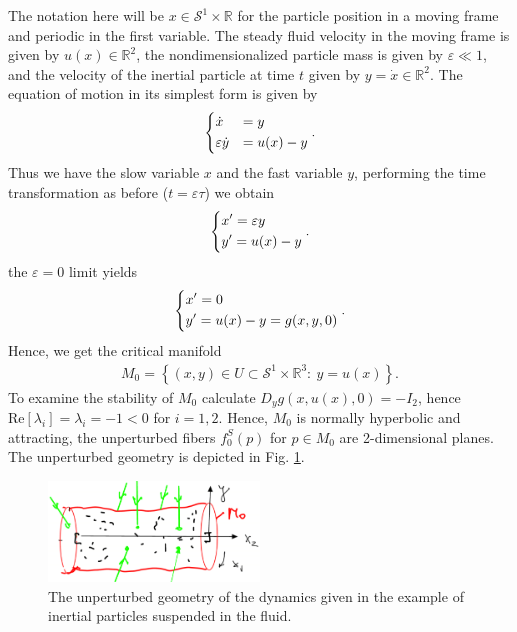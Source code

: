 \begin{ex}
The notation here will be $x\in \mathcal{S}^{1}\times \mathbb{R}$ for the particle position in a moving frame and periodic in the first variable. The steady fluid velocity in the moving frame is given by $u(x) \in \mathbb{R}^{2}$, the nondimensionalized particle mass is given by $\varepsilon \ll 1$, and the velocity of the inertial particle at time $t$ given by $y=\dot{x}\in \mathbb{R}^{2}$. The equation of motion in its simplest form is given by \cite{Maxey1983}
\begin{align}
	\begin{dcases}
		\dot{x} &=y\\
		\varepsilon \dot{y} & = u(x) - y
	\end{dcases}
	.
\end{align}
Thus we have the slow variable $x$ and the fast variable $y$, performing the time transformation as before ($t = \varepsilon \tau$) we obtain
\begin{align}
\begin{dcases}
	x' = \varepsilon y \\
	y' = u(x) - y
\end{dcases}
.	
\end{align}
the $\varepsilon=0$ limit yields
\begin{align}
	\begin{dcases}
		x' = 0 \\
		y' = u(x) - y = g(x,y,0)
	\end{dcases}
	.
\end{align}
Hence, we get the critical manifold
\begin{align}
	M_0 = \left\{ (x,y)\in U \subset \mathcal{S}^{1}\times \mathbb{R}^{3}:\ y = u(x)\right\}.
\end{align}
To examine the stability of $M_0$ calculate $D_{y}g(x, u(x), 0) = - I_{2}$, hence $ \textrm{Re} [\lambda_i]= \lambda_i =-1<0$ for $i=1,2$. Hence, $M_0$ is normally hyperbolic and attracting, the unperturbed fibers $f_{0}^{S}(p)$ for $p\in M_0$ are 2-dimensional planes. The unperturbed geometry is depicted in Fig. \ref{fig:unperturbed_fluid_geometry}.
\begin{figure}[h!]
	\centering
	\includegraphics[width=0.5\textwidth]{figures/ch9/21unperturbed_fluid_geometry.png}
	\caption{The unperturbed geometry of the dynamics given in the example of inertial particles suspended in the fluid.}
	\label{fig:unperturbed_fluid_geometry}
\end{figure}


\end{ex}
